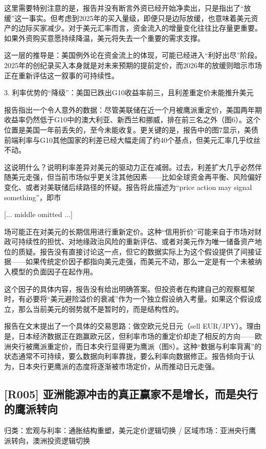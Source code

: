 \documentclass[11pt]{ctexart}
\begin{document}
这里需要特别注意的是，报告并没有断言外资已经开始净卖出，只是指出了“放缓”这一事实。但考虑到2025年的买入量级，即便只是边际放缓，也意味着美元资产的边际买家减少。对于美元汇率而言，资金流入的增量变化往往比存量更重要。如果外资购买意愿持续降温，美元将失去一个重要的需求支撑。

这一层的推导是：美国例外论在资金流上的体现，可能已经进入“利好出尽”阶段。2025年的创纪录买入本身就是对未来预期的提前定价，而2026年的放缓则暗示市场正在重新评估这一叙事的可持续性。

3. 利率优势的“降级”：美国已跌出G10收益率前三，且利差重定价未能推升美元

报告指出一个令人意外的数据：尽管美联储在近一个月被鹰派重定价，美国两年期收益率仍然低于G10中的澳大利亚、新西兰和挪威，排在前三名之外（图6）。这个位置是美国一年前丢失的，至今未能收复。更关键的是，报告中的图7显示，美债前端利率与G10其他国家的利差已经大幅走阔了约40个基点，但美元汇率几乎纹丝不动。

这说明什么？说明利率差异对美元的驱动力正在减弱。过去，利差扩大几乎必然伴随美元走强，但当前市场似乎更关注其他因素——比如全球资金再平衡、风险偏好变化、或者对美联储后续路径的怀疑。报告将此描述为“price action may signal something”，即市

[... middle omitted ...]

场可能正在对美元的长期信用进行重新定价。这种“信用折价”可能来自于市场对财政可持续性的担忧、对地缘政治风险的重新评估、或者对美元作为唯一储备资产地位的质疑。报告没有直接讨论这一点，但它的数据实际上为这个假设提供了间接证据——如果传统定价因子都指向美元走强，而美元不动，那么一定是有一个未被纳入模型的负面因子在起作用。

这个因子的具体内容，报告没有给出明确答案。但投资者在构建自己的观察框架时，有必要将“美元避险溢价的衰减”作为一个独立假设纳入考量。如果这个假设成立，那么当前美元的弱势就不是暂时的，而是结构性的。

报告在文末提出了一个具体的交易思路：做空欧元兑日元（sell EUR/JPY）。理由是，日本经济数据正在跑赢欧元区，但利率市场的重定价却走了相反的方向——欧洲央行被鹰派重定价，而日本央行显得更为鹰派（图8）。这种“数据与利率背离”的状态通常不可持续，要么数据向利率靠拢，要么利率向数据修正。报告倾向于认为，日本央行更鹰派的态度将逐渐被市场定价，从而推动日元走强。

\subsection{[R005] 亚洲能源冲击的真正赢家不是增长，而是央行的鹰派转向}
{\small\color{refgray}归类：宏观与利率：通胀结构重塑，美元定价逻辑切换 / 区域市场：亚洲央行鹰派转向，澳洲投资逻辑切换}
\end{document}
